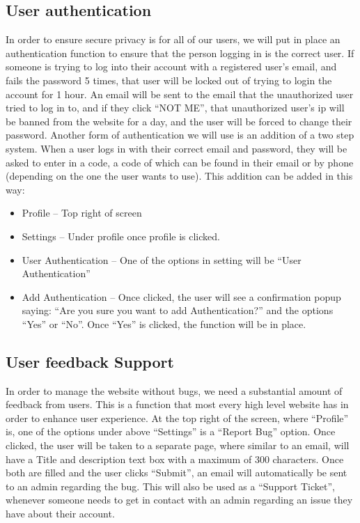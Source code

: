 \documentclass[conference]{IEEEtran}
\begin{document}
\subsection{User authentication}
In order to ensure secure privacy is for all of our users, we will put in place an authentication function to ensure that the person logging in is the correct user. If someone is trying to log into their account with a registered user's email, and fails the password 5 times, that user will be locked out of trying to login the account for 1 hour. An email will be sent to the email that the unauthorized user tried to log in to, and if they click “NOT ME”, that unauthorized user’s ip will be banned from the website for a day, and the user will be forced to change their password. Another form of authentication we will use is an addition of a two step system. When a user logs in with their correct email and password, they will be asked to enter in a code, a code of which can be found in their email or by phone (depending on the one the user wants to use). This addition can be added in this way:
\begin{itemize}
    \item Profile – Top right of screen
    \item Settings – Under profile once profile is clicked.
    \item User Authentication – One of the options in setting will be “User Authentication”
    \item Add Authentication – Once clicked, the user will see a confirmation popup saying: “Are you sure you want to add Authentication?” and the options “Yes” or “No”. Once “Yes” is clicked, the function will be in place.
\end{itemize}
\subsection{User feedback Support}
In order to manage the website without bugs, we need a substantial amount of feedback from users. This is a function that most every high level website has in order to enhance user experience. At the top right of the screen, where “Profile” is, one of the options under above “Settings” is a “Report Bug” option. Once clicked, the user will be taken to a separate page, where similar to an email, will have a Title and description text box with a maximum of 300 characters. Once both are filled and the user clicks “Submit”, an email will automatically be sent to an admin regarding the bug. This will also be used as a “Support Ticket”, whenever someone needs to get in contact with an admin regarding an issue they have about their account.
\end{document}
